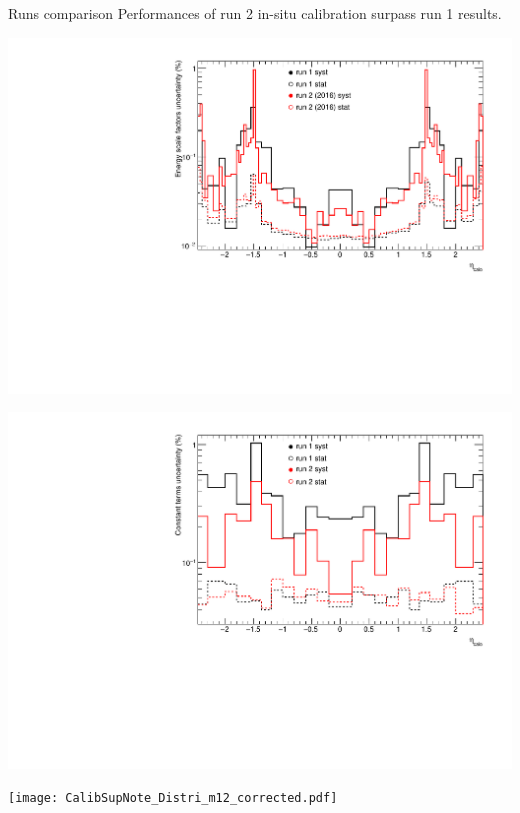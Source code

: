 \begin{frame}{Runs comparison}
  Performances of run 2 in-situ calibration surpass run 1 results.

  \begin{minipage}{0.42\linewidth} 
    \includegraphics[width=\linewidth]{Figures/CompareSystRun_alpha.pdf}
  \end{minipage}
  \hfill
  \begin{minipage}{0.42\linewidth}
    \includegraphics[width=\linewidth]{Figures/CompareSystRun_c.pdf}
  \end{minipage}
  \centering
  \begin{minipage}{0.53\linewidth}
    \texttt{[image: CalibSupNote\_Distri\_m12\_corrected.pdf]}
  \end{minipage}

\end{frame}

